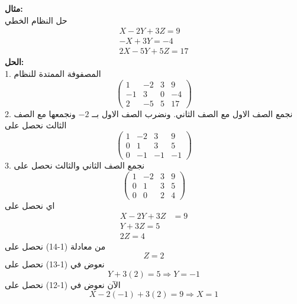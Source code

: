 \noindent \textbf{مثال:} \\ \noindent
حل النظام الخطي
\begin{gather*}
	X-2Y + 3Z=9\\
	-X +3Y =-4\\
	2X-5Y+5Z=17
\end{gather*}
\textbf{الحل:}\\
1. المصفوفة الممتدة للنظام
 \[
\left(
\begin{array}{ccc|c}
	1&-2&3&9\\
	-1&3&0&-4\\
	2 &-5& 5& 17
\end{array}
\right)
\]
2. نجمع الصف الاول مع الصف الثاني. ونضرب الصف الاول بــ $-2$ ونجمعها مع الصف الثالث نحصل على
 \[
\left(
\begin{array}{ccc|c}
	1&-2&3&9\\
	0&1&3&5\\
	0 &-1& -1& -1
\end{array}
\right)
\]
3. نجمع الصف الثاني والثالث نحصل على
 \[
\left(
\begin{array}{ccc|c}
	1&-2&3&9\\
	0&1&3&5\\
	0 &0& 2& 4
\end{array}
\right)
\]
اي نحصل على
\begin{align}
	X-2Y+3Z&=9\\
	Y + 3Z=5\\
	2Z=4
\end{align}
من معادلة (1-14) نحصل على 
\[
Z=2
\]
نعوض في (1-13) نحصل على 
\[
Y + 3(2) = 5 \Rightarrow Y = -1
\]
الآن نعوض في (1-12) نحصل على
\[
X - 2(-1) + 3(2) = 9 \Rightarrow X = 1
\]